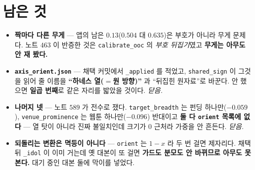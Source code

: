 \documentclass[11pt]{article}
\begin{document}
\section*{남은 것}

\begin{itemize}
\item \textbf{짝마다 다른 무게} --- 앱의 남은 $0.13$($0.504$ 대 $0.635$)은
부호가 아니라 무게 문제다. 노트 $463$ 이 반증한 것은
\texttt{calibrate\_ooc} 의 \emph{부호 뒤집기}였고 \textbf{무게는 아무도
안 재 봤다.}
\item \textbf{\texttt{axis\_orient.json}} --- 채택 커밋에서
\texttt{\_applied} 를 적었고, \texttt{shared\_sign} 이 그것을 읽어 줄
이름을 \textbf{``하네스 열($=$원 방향)''} 과 ``뒤집힌 원자료''로 바꾼다.
안 했으면 \textbf{일곱 번째}로 같은 자리를 밟았을 것이다. \emph{닫음.}
\item \textbf{나머지 넷} --- 노트 $589$ 가 전수로 쟀다.
\texttt{target\_breadth} 는 펀딩 하나만($-0.059$),
\texttt{venue\_prominence} 는 웹툰 하나만($-0.096$) 반대이고
\textbf{둘 다 \texttt{orient} 목록에 없다} --- 열 탓이 아니라 진짜
불일치인데 크기가 $0$ 근처라 가중을 안 흔든다. \emph{닫음.}
\item \textbf{되돌리는 변환은 멱등이 아니다} --- \texttt{orient} 는
$1-x$ 라 두 번 걸면 제자리다. 채택 뒤 \texttt{\_idol} 이 이미 거는데
옛 대본이 또 걸면 \textbf{가드도 분모도 안 바뀌므로 아무도 못 본다.}
대기 중인 대본 둘에 막이를 넣었다.
\end{itemize}
\end{document}
